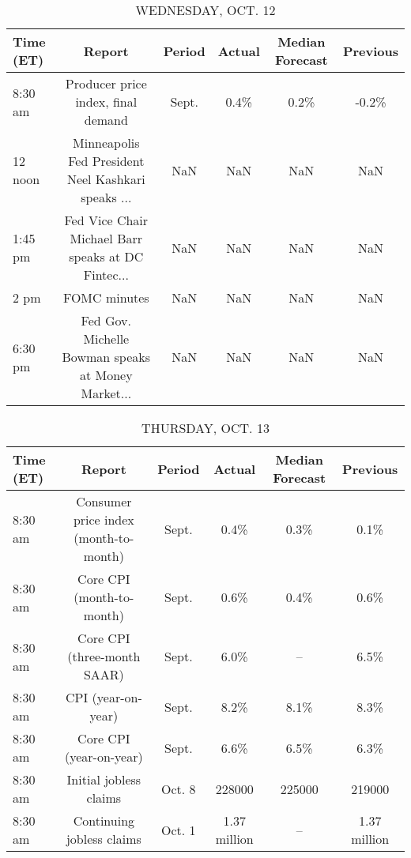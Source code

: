 \documentclass{article}%
\begin{document}
\begin{table}[htbp]%
\caption{WEDNESDAY, OCT. 12}%
\centering%
\begin{adjustbox}{width=1\textwidth}%
\begin{tabular}{lccccc}
\toprule
Time (ET) &                                             Report & Period & Actual & Median Forecast & Previous \\
\midrule
  8:30 am &                 Producer price index, final demand &  Sept. &   0.4\% &            0.2\% &    -0.2\% \\
  12 noon & Minneapolis Fed President Neel Kashkari speaks ... &    NaN &    NaN &             NaN &      NaN \\
  1:45 pm & Fed Vice Chair Michael Barr speaks at DC Fintec... &    NaN &    NaN &             NaN &      NaN \\
     2 pm &                                       FOMC minutes &    NaN &    NaN &             NaN &      NaN \\
  6:30 pm & Fed Gov. Michelle Bowman speaks at Money Market... &    NaN &    NaN &             NaN &      NaN \\
\bottomrule
\end{tabular}
%
\end{adjustbox}%
\end{table}

%


\begin{table}[htbp]%
\caption{THURSDAY, OCT. 13}%
\centering%
\begin{adjustbox}{width=1\textwidth}%
\begin{tabular}{lccccc}
\toprule
Time (ET) &                                Report & Period &       Actual & Median Forecast &     Previous \\
\midrule
  8:30 am & Consumer price index (month-to-month) &  Sept. &         0.4\% &            0.3\% &         0.1\% \\
  8:30 am &             Core CPI (month-to-month) &  Sept. &         0.6\% &            0.4\% &         0.6\% \\
  8:30 am &           Core CPI (three-month SAAR) &  Sept. &         6.0\% &              -- &         6.5\% \\
  8:30 am &                    CPI (year-on-year) &  Sept. &         8.2\% &            8.1\% &         8.3\% \\
  8:30 am &               Core CPI (year-on-year) &  Sept. &         6.6\% &            6.5\% &         6.3\% \\
  8:30 am &                Initial jobless claims & Oct. 8 &       228000 &          225000 &       219000 \\
  8:30 am &             Continuing jobless claims & Oct. 1 & 1.37 million &              -- & 1.37 million \\
\bottomrule
\end{tabular}
%
\end{adjustbox}%
\end{table}
\end{document}
